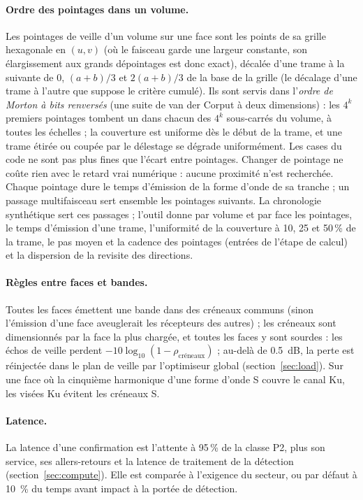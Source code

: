 \documentclass[11pt,a4paper]{article}
\begin{document}
\paragraph{Ordre des pointages dans un volume.} Les pointages de veille d'un volume sur une face sont les points de sa
grille hexagonale en $(u,v)$ (où le faisceau garde une largeur constante, son élargissement aux grands dépointages est
donc exact), décalée d'une trame à la suivante de $0$, $(a+b)/3$ et $2(a+b)/3$ de la base de la grille (le décalage
d'une trame à l'autre que suppose le critère cumulé). Ils sont servis dans l'\emph{ordre de Morton à bits renversés}
(une suite de van der Corput à deux dimensions) : les $4^k$ premiers pointages tombent un dans chacun des $4^k$
sous-carrés du volume, à toutes les échelles ; la couverture est uniforme dès le début de la trame, et une trame étirée
ou coupée par le délestage se dégrade uniformément. Les cases du code ne sont pas plus fines que l'écart entre
pointages. Changer de pointage ne coûte rien avec le retard vrai numérique : aucune proximité n'est recherchée. Chaque
pointage dure le temps d'émission de la forme d'onde de sa tranche ; un passage multifaisceau sert ensemble les
pointages suivants. La chronologie synthétique sert ces passages ; l'outil donne par volume et par face les pointages,
le temps d'émission d'une trame, l'uniformité de la couverture à 10, 25 et 50\,\% de la trame, le pas moyen et la
cadence des pointages (entrées de l'étape de calcul) et la dispersion de la revisite des directions.

\paragraph{Règles entre faces et bandes.} Toutes les faces émettent une bande dans des créneaux communs (sinon
l'émission d'une face aveuglerait les récepteurs des autres) ; les créneaux sont dimensionnés par la face la plus
chargée, et toutes les faces y sont sourdes : les échos de veille perdent $-10\log_{10}(1-\rho_{\mathrm{créneaux}})$ ;
au-delà de \SI{0.5}{dB}, la perte est réinjectée dans le plan de veille par l'optimiseur global
(section~\ref{sec:load}). Sur une face où la cinquième harmonique d'une forme d'onde S couvre le canal Ku, les visées Ku
évitent les créneaux S.

\paragraph{Latence.} La latence d'une confirmation est l'attente à 95\,\% de la classe P2, plus son service, ses
allers-retours et la latence de traitement de la détection (section~\ref{sec:compute}). Elle est comparée à l'exigence
du secteur, ou par défaut à \SI{10}{\percent} du temps avant impact à la portée de détection.
\end{document}
